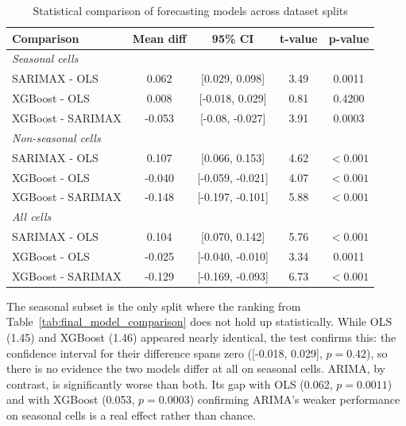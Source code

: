 \begin{table}[htbp]
	\centering
	\caption{Statistical comparison of forecasting models across dataset splits}
	\label{tab:stat_results}
	\begin{tabular}{lcccc}
		\toprule
		\textbf{Comparison} & \textbf{Mean diff} & \textbf{95\% CI} & \textbf{t-value} & \textbf{p-value} \\
		\midrule
		
		\multicolumn{4}{l}{\textit{Seasonal cells}} \\
		SARIMAX - OLS      & 0.062 & [0.029, 0.098] & 3.49 & 0.0011 \\
		XGBoost - OLS    & 0.008 & [-0.018, 0.029] & 0.81 & 0.4200 \\
		XGBoost - SARIMAX  & -0.053 & [-0.08, -0.027] & 3.91 & 0.0003 \\
		
		\midrule
		\multicolumn{4}{l}{\textit{Non-seasonal cells}} \\
		SARIMAX - OLS      & 0.107 & [0.066, 0.153] & 4.62& $< 0.001$ \\
		XGBoost - OLS    & -0.040 & [-0.059, -0.021] & 4.07 & $< 0.001$ \\
		XGBoost - SARIMAX  & -0.148 & [-0.197, -0.101] & 5.88 & $< 0.001$ \\
		
		\midrule
		\multicolumn{4}{l}{\textit{All cells}} \\
		SARIMAX - OLS & 0.104 & [0.070, 0.142] & 5.76 & $< 0.001$ \\
		XGBoost - OLS & -0.025 & [-0.040, -0.010] & 3.34 & 0.0011 \\
		XGBoost - SARIMAX & -0.129 & [-0.169, -0.093] & 6.73 & $< 0.001$ \\
		
		\bottomrule
	\end{tabular}
\end{table}

The seasonal subset is the only split where the ranking from Table~\ref{tab:final_model_comparison} does not hold up statistically. While OLS (1.45) and XGBoost (1.46) appeared nearly identical, the test confirms this: the confidence interval for their difference spans zero ([-0.018, 0.029], $p = 0.42$), so there is no evidence the two models differ at all on seasonal cells. ARIMA, by contrast, is significantly worse than both. Its gap with OLS (0.062, $p = 0.0011$) and with XGBoost (0.053, $p = 0.0003$) confirming ARIMA's weaker performance on seasonal cells is a real effect rather than chance. \\

